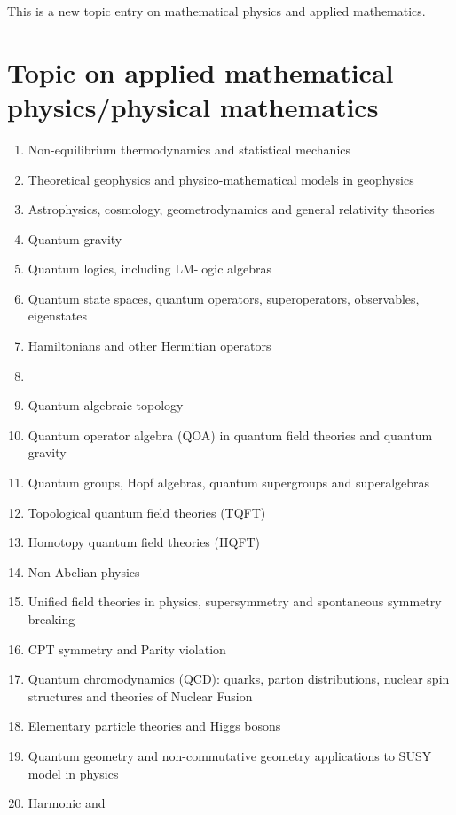 \documentclass[12pt]{article}
\begin{document}
This is a new topic entry on mathematical physics and applied mathematics. 

\section{Topic on applied mathematical physics/physical mathematics}

\begin{enumerate}
\item Non-equilibrium thermodynamics and statistical mechanics
\item Theoretical geophysics and physico-mathematical models in geophysics
\item Astrophysics, cosmology, geometrodynamics and general relativity theories
\item Quantum gravity
\item Quantum logics, including LM-logic algebras
\item Quantum state spaces, quantum operators, superoperators, observables, eigenstates
\item Hamiltonians and other Hermitian operators
\item {}
\item Quantum algebraic topology
\item Quantum operator algebra (QOA) in quantum field theories and quantum gravity
\item Quantum groups, Hopf algebras, quantum supergroups and superalgebras
\item Topological quantum field theories (TQFT)
\item Homotopy quantum field theories (HQFT)
\item Non-Abelian physics
\item Unified field theories in physics, supersymmetry and spontaneous symmetry breaking
\item CPT symmetry and Parity violation
\item Quantum chromodynamics (QCD): quarks, parton distributions, nuclear spin structures and theories of Nuclear Fusion
\item Elementary particle theories and Higgs bosons
\item Quantum geometry and non-commutative geometry applications to SUSY model in physics 
\item Harmonic and  

\end{enumerate}
\end{document}
